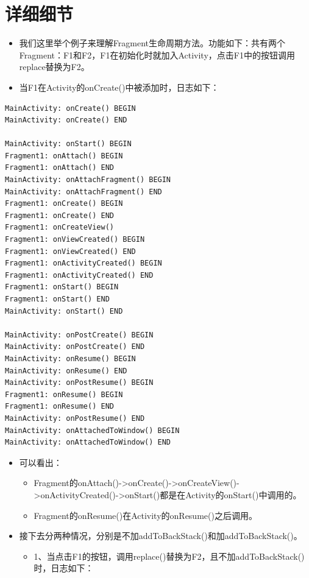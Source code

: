 \documentclass[9pt, b5paaper]{book}
\begin{document}
\section{详细细节}
\label{sec-2-8}
\begin{itemize}
\item 我们这里举个例子来理解Fragment生命周期方法。功能如下：共有两个Fragment：F1和F2，F1在初始化时就加入Activity，点击F1中的按钮调用replace替换为F2。
\item 当F1在Activity的onCreate()中被添加时，日志如下：
\end{itemize}
\begin{verbatim}
MainActivity: onCreate() BEGIN
MainActivity: onCreate() END

MainActivity: onStart() BEGIN
Fragment1: onAttach() BEGIN 
Fragment1: onAttach() END
MainActivity: onAttachFragment() BEGIN
MainActivity: onAttachFragment() END
Fragment1: onCreate() BEGIN
Fragment1: onCreate() END
Fragment1: onCreateView()
Fragment1: onViewCreated() BEGIN
Fragment1: onViewCreated() END
Fragment1: onActivityCreated() BEGIN
Fragment1: onActivityCreated() END
Fragment1: onStart() BEGIN
Fragment1: onStart() END
MainActivity: onStart() END

MainActivity: onPostCreate() BEGIN
MainActivity: onPostCreate() END
MainActivity: onResume() BEGIN
MainActivity: onResume() END
MainActivity: onPostResume() BEGIN
Fragment1: onResume() BEGIN
Fragment1: onResume() END
MainActivity: onPostResume() END
MainActivity: onAttachedToWindow() BEGIN
MainActivity: onAttachedToWindow() END
\end{verbatim}
\begin{itemize}
\item 可以看出：
\begin{itemize}
\item Fragment的onAttach()->onCreate()->onCreateView()->onActivityCreated()->onStart()都是在Activity的onStart()中调用的。
\item Fragment的onResume()在Activity的onResume()之后调用。
\end{itemize}
\item 接下去分两种情况，分别是不加addToBackStack()和加addToBackStack()。
\begin{itemize}
\item 1、当点击F1的按钮，调用replace()替换为F2，且不加addToBackStack()时，日志如下：
\end{itemize}
\end{itemize}
\end{document}
